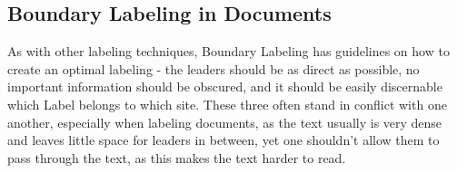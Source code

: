 \documentclass[11pt,a4paper]{article}
\begin{document}
\subsection{Boundary Labeling in Documents}
As with other labeling techniques, Boundary Labeling has guidelines on how to create an optimal labeling - the leaders should be as direct as possible, no important information should be obscured, and it should be easily discernable which Label belongs to which site. These three often stand in conflict with one another, especially when labeling documents, as the text usually is very dense and leaves little space for leaders in between, yet one shouldn't allow them to pass through the text, as this makes the text harder to read.







\end{document}
